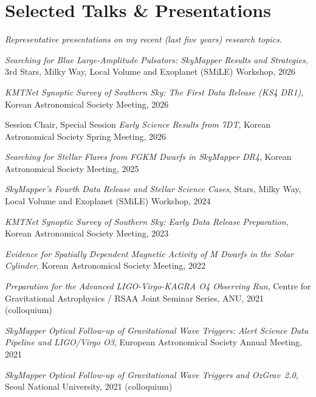 \documentclass[letterpaper,11pt]{article}
\begin{document}
\section*{Selected Talks \& Presentations}
\emph{Representative presentations on my recent (last five years) research topics.}
\begin{etaremune}
\item \emph{Searching for Blue Large-Amplitude Pulsators: SkyMapper Results and
Strategies}, 3rd Stars, Milky Way, Local Volume and Exoplanet (SMiLE) Workshop, 2026
\item \emph{KMTNet Synoptic Survey of Southern Sky: The First Data Release (KS4 DR1)},
Korean Astronomical Society Meeting, 2026
\item Session Chair, Special Session \emph{Early Science Results from 7DT}, Korean
Astronomical Society Spring Meeting, 2026
\item \emph{Searching for Stellar Flares from FGKM Dwarfs in SkyMapper DR4}, Korean
Astronomical Society Meeting, 2025
\item \emph{SkyMapper's Fourth Data Release and Stellar Science Cases}, Stars, Milky Way,
Local Volume and Exoplanet (SMiLE) Workshop, 2024
\item \emph{KMTNet Synoptic Survey of Southern Sky: Early Data Release Preparation},
Korean Astronomical Society Meeting, 2023
\item \emph{Evidence for Spatially Dependent Magnetic Activity of M Dwarfs in the Solar
Cylinder}, Korean Astronomical Society Meeting, 2022
\item \emph{Preparation for the Advanced LIGO-Virgo-KAGRA O4 Observing Run}, Centre for
Gravitational Astrophysics / RSAA Joint Seminar Series, ANU, 2021 (colloquium)
\item \emph{SkyMapper Optical Follow-up of Gravitational Wave Triggers: Alert Science
Data Pipeline and LIGO/Virgo O3}, European Astronomical Society Annual Meeting, 2021
\item \emph{SkyMapper Optical Follow-up of Gravitational Wave Triggers and OzGrav~2.0},
Seoul National University, 2021 (colloquium)

\end{etaremune}


\end{document}
